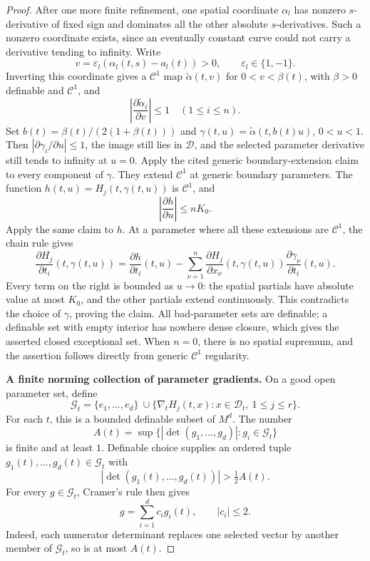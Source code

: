 \begin{proof}
After one more finite refinement, one spatial coordinate
\(\alpha_l\) has nonzero \(s\)-derivative of fixed sign and dominates
all the other absolute \(s\)-derivatives. Such a nonzero coordinate
exists, since an eventually constant curve could not carry a
derivative tending to infinity. Write
\[
 v=\varepsilon_l(\alpha_l(t,s)-a_l(t))>0,
 \qquad \varepsilon_l\in\{1,-1\}.
\]
Inverting this coordinate gives a \(\mathcal C^1\) map
\(\widetilde\alpha(t,v)\) for \(0<v<\beta(t)\), with \(\beta>0\)
definable and \(\mathcal C^1\), and
\[
 \left|\frac{\partial\widetilde\alpha_i}{\partial v}\right|
 \le1\quad(1\le i\le n).
\]
Set \(b(t)=\beta(t)/(2(1+\beta(t)))\) and
\(\gamma(t,u)=\widetilde\alpha(t,b(t)u)\), \(0<u<1\).
Then \(|\partial\gamma_i/\partial u|\le1\), the image still lies in
\(\mathcal D\), and the selected parameter derivative still tends
to infinity at \(u=0\). Apply the cited generic boundary-extension
claim to every component of \(\gamma\). They extend
\(\mathcal C^1\) at generic boundary parameters. The function
\(h(t,u)=H_j(t,\gamma(t,u))\) is \(\mathcal C^1\), and
\[
 \left|\frac{\partial h}{\partial u}\right|\le nK_0.
\]
Apply the same claim to \(h\). At a parameter where all these
extensions are \(\mathcal C^1\), the chain rule gives
\[
 \frac{\partial H_j}{\partial t_i}(t,\gamma(t,u))
 =
 \frac{\partial h}{\partial t_i}(t,u)
 -\sum_{\nu=1}^n
   \frac{\partial H_j}{\partial x_\nu}(t,\gamma(t,u))
   \frac{\partial\gamma_\nu}{\partial t_i}(t,u).
 \tag{158.4}
\]
Every term on the right is bounded as \(u\to0\): the spatial
partials have absolute value at most \(K_0\), and the other
partials extend continuously. This contradicts the choice of
\(\gamma\), proving the claim. All bad-parameter sets are definable;
a definable set with empty interior has nowhere dense closure,
which gives the asserted closed exceptional set. When \(n=0\),
there is no spatial supremum, and the assertion follows directly
from generic \(\mathcal C^1\) regularity.

\textbf{A finite norming collection of parameter gradients.}
On a good open parameter set, define
\[
 \mathcal G_t=
 \{e_1,\ldots,e_d\}
 \ \cup
 \{\nabla_tH_j(t,x):x\in\mathcal D_t,\ 1\le j\le r\}.
\]
For each \(t\), this is a bounded definable subset of \(M^d\).
The number
\[
 A(t)=\sup\{|\det(g_1,\ldots,g_d)|:g_i\in\mathcal G_t\}
\]
is finite and at least \(1\). Definable choice supplies an ordered
tuple \(g_1(t),\ldots,g_d(t)\in\mathcal G_t\) with
\[
 |\det(g_1(t),\ldots,g_d(t))|>\tfrac12 A(t).
 \tag{158.5}
\]
For every \(g\in\mathcal G_t\), Cramer's rule then gives
\[
 g=\sum_{i=1}^d c_i g_i(t),\qquad |c_i|\le2.
 \tag{158.6}
\]
Indeed, each numerator determinant replaces one selected vector
by another member of \(\mathcal G_t\), so is at most \(A(t)\).


\end{proof}
